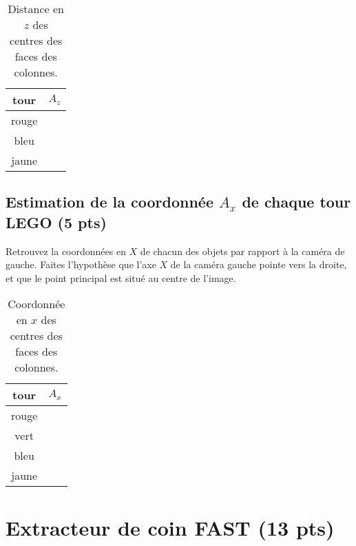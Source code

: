 \documentclass[12pt]{article}
\begin{document}
\begin{table}[h]
\caption{Distance en $z$ des centres des faces des colonnes.}
\label{TableCoord}
\begin{center}
\begin{tabular}{|c|c|}
\hline
 tour     &    $A_z$ \\
\hline
 rouge      &                          \\
 bleu      &                            \\
jaune     &                         \\
\hline
\end{tabular}
\end{center}
\end{table}


\subsection{Estimation de la coordonnée $A_x$ de chaque tour LEGO (5 pts)}
Retrouvez la coordonnées en $X$ de chacun des objets par rapport à la caméra de gauche. Faites l'hypothèse que l'axe $X$ de la caméra gauche pointe vers la droite, et que le point principal est situé au centre de l'image. 

\begin{table}[h]
\caption{Coordonnée en $x$ des centres des faces des colonnes.}
\label{TableX}
\begin{center}
\begin{tabular}{|c|c|}
\hline
 tour     &    $A_x$ \\
\hline
 rouge      &                          \\
 vert      &                           \\
 bleu     &                            \\
 jaune     &                         \\
\hline
\end{tabular}
\end{center}
\end{table}


\newpage
\section{Extracteur de coin FAST (13 pts)}
 \label{SectionFAST}
\end{document}
